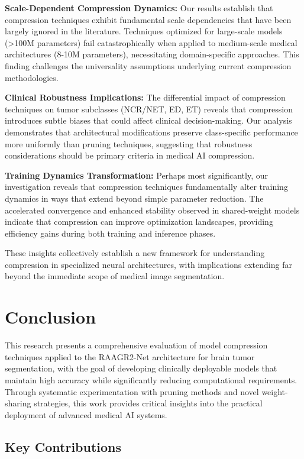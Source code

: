 \documentclass[12pt,a4paper]{article}
\begin{document}
\begin{enumerate}
\textbf{Scale-Dependent Compression Dynamics:} Our results establish that compression techniques exhibit fundamental scale dependencies that have been largely ignored in the literature. Techniques optimized for large-scale models (>100M parameters) fail catastrophically when applied to medium-scale medical architectures (8-10M parameters), necessitating domain-specific approaches. This finding challenges the universality assumptions underlying current compression methodologies.

\textbf{Clinical Robustness Implications:} The differential impact of compression techniques on tumor subclasses (NCR/NET, ED, ET) reveals that compression introduces subtle biases that could affect clinical decision-making. Our analysis demonstrates that architectural modifications preserve class-specific performance more uniformly than pruning techniques, suggesting that robustness considerations should be primary criteria in medical AI compression.

\textbf{Training Dynamics Transformation:} Perhaps most significantly, our investigation reveals that compression techniques fundamentally alter training dynamics in ways that extend beyond simple parameter reduction. The accelerated convergence and enhanced stability observed in shared-weight models indicate that compression can improve optimization landscapes, providing efficiency gains during both training and inference phases.

These insights collectively establish a new framework for understanding compression in specialized neural architectures, with implications extending far beyond the immediate scope of medical image segmentation.

\section{Conclusion}
\label{sec:conclusion}

This research presents a comprehensive evaluation of model compression techniques applied to the RAAGR2-Net architecture for brain tumor segmentation, with the goal of developing clinically deployable models that maintain high accuracy while significantly reducing computational requirements. Through systematic experimentation with pruning methods and novel weight-sharing strategies, this work provides critical insights into the practical deployment of advanced medical AI systems.

\subsection{Key Contributions}


\end{enumerate}
\end{document}

